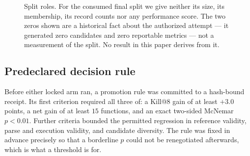 \documentclass[10pt,conference]{IEEEtran}
\makeatletter
\newcommand{\killk}[1]{Kill@#1}
\makeatother
\begin{document}
\begin{figure}[t]
\centering
{}
\caption{Split roles. For the consumed final split we give neither its size, its
membership, its record counts nor any performance score. The two zeros shown are
a historical fact about the authorized attempt --- it generated zero candidates
and zero reportable metrics --- not a measurement of the split. No result in this
paper derives from it.}
\label{fig:splits}
\end{figure}

\subsection{Predeclared decision rule}

Before either locked arm ran, a promotion rule was committed to a hash-bound
receipt. Its first criterion required all three of: a \killk{8} gain of at least
$+3.0$ points, a net gain of at least $15$ functions, and an exact two-sided
McNemar $p < 0.01$. Further criteria bounded the permitted regression in
reference validity, parse and execution validity, and candidate diversity. The
rule was fixed in advance precisely so that a borderline $p$ could not be
renegotiated afterwards, which is what a threshold is for.
\end{document}
